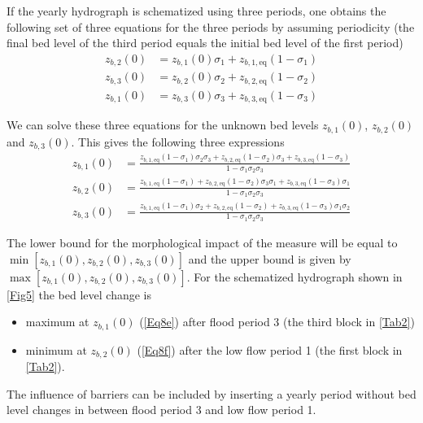 If the yearly hydrograph is schematized using three periods, one obtains the following set of three equations for the three periods by assuming periodicity (the final bed level of the third period equals the initial bed level of the first period)
%
\begin{align}
z_{b,2}(0) &= z_{b,1}(0) \sigma_1 + z_{b,1,\text{eq}} (1-\sigma_1) \label{Eq8b} \\
z_{b,3}(0) &= z_{b,2}(0) \sigma_2 + z_{b,2,\text{eq}} (1-\sigma_2) \label{Eq8c} \\
z_{b,1}(0) &= z_{b,3}(0) \sigma_3 + z_{b,3,\text{eq}} (1-\sigma_3) \label{Eq8d}
\end{align}

We can solve these three equations for the unknown bed levels $z_{b,1}(0)$, $z_{b,2}(0)$ and $z_{b,3}(0)$.
This gives the following three expressions
%
\begin{align}
z_{b,1}(0) &= \frac{z_{b,1,\text{eq}} (1-\sigma_1) \sigma_2 \sigma_3 + z_{b,2,\text{eq}} (1-\sigma_2) \sigma_3 + z_{b,3,\text{eq}} (1-\sigma_3)}{1 - \sigma_1 \sigma_2 \sigma_3} \label{Eq8e} \\
z_{b,2}(0) &= \frac{z_{b,1,\text{eq}} (1-\sigma_1) + z_{b,2,\text{eq}} (1-\sigma_2) \sigma_3 \sigma_1 + z_{b,3,\text{eq}} (1-\sigma_3) \sigma_1}{1 - \sigma_1 \sigma_2 \sigma_3} \label{Eq8f} \\
z_{b,3}(0) &= \frac{z_{b,1,\text{eq}} (1-\sigma_1) \sigma_2 + z_{b,2,\text{eq}} (1-\sigma_2) + z_{b,3,\text{eq}} (1-\sigma_3) \sigma_1 \sigma_2}{1 - \sigma_1 \sigma_2 \sigma_3} \label{Eq8g}
\end{align}

The lower bound for the morphological impact of the measure will be equal to $\min[z_{b,1}(0), z_{b,2}(0), z_{b,3}(0)]$ and the upper bound is given by $\max[z_{b,1}(0), z_{b,2}(0), z_{b,3}(0)]$.
For the schematized hydrograph shown in \autoref{Fig5} the bed level change is

\begin{itemize}
\item maximum at $z_{b,1}(0)$ (\autoref{Eq8e}) after flood period 3 (the third block in \autoref{Tab2})
\item minimum at $z_{b,2}(0)$ (\autoref{Eq8f}) after the low flow period 1 (the first block in \autoref{Tab2}).
\end{itemize}

The influence of barriers can be included by inserting a yearly period without bed level changes in between flood period 3 and low flow period 1.

